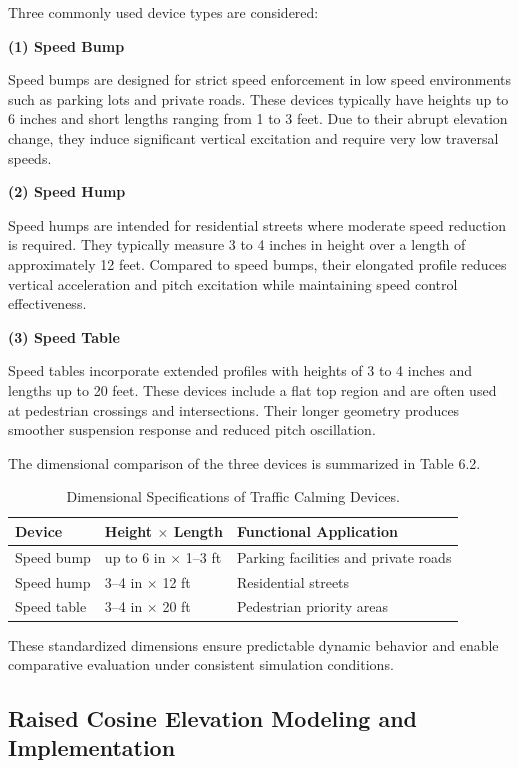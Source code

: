 \documentclass[a4paper,12pt,one side]{report}
\theoremstyle{definition}
\begin{document}
\begin{itemize}
Three commonly used device types are considered:

\textbf{(1) Speed Bump}

Speed bumps are designed for strict speed enforcement in low speed environments such as parking lots and private roads. These devices typically have heights up to 6 inches and short lengths ranging from 1 to 3 feet. Due to their abrupt elevation change, they induce significant vertical excitation and require very low traversal speeds.

\textbf{(2) Speed Hump}

Speed humps are intended for residential streets where moderate speed reduction is required. They typically measure 3 to 4 inches in height over a length of approximately 12 feet. Compared to speed bumps, their elongated profile reduces vertical acceleration and pitch excitation while maintaining speed control effectiveness.

\textbf{(3) Speed Table}

Speed tables incorporate extended profiles with heights of 3 to 4 inches and lengths up to 20 feet. These devices include a flat top region and are often used at pedestrian crossings and intersections. Their longer geometry produces smoother suspension response and reduced pitch oscillation.

The dimensional comparison of the three devices is summarized in Table 6.2.

\begin{table}[h]
\centering
\caption{Dimensional Specifications of Traffic Calming Devices.}
\label{tab:6.2}
\begin{tabular}{|l|l|l|}
\hline
\textbf{Device} & \textbf{Height $\times$ Length} & \textbf{Functional Application} \\
\hline
Speed bump  & up to 6 in $\times$ 1--3 ft & Parking facilities and private roads \\
Speed hump  & 3--4 in $\times$ 12 ft      & Residential streets \\
Speed table & 3--4 in $\times$ 20 ft      & Pedestrian priority areas \\
\hline
\end{tabular}
\end{table}

These standardized dimensions ensure predictable dynamic behavior and enable comparative evaluation under consistent simulation conditions.

\subsection{Raised Cosine Elevation Modeling and Implementation}


\end{itemize}
\end{document}
